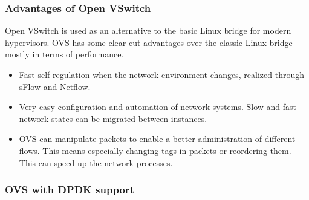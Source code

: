 \documentclass[11pt,a4paper,twoside,openright,bachelor,english]{netthesis}
\begin{document}
\subsubsection{Advantages of Open VSwitch}

Open VSwitch is used as an alternative to the basic Linux bridge for modern hypervisors. OVS has some clear cut advantages over the classic Linux bridge mostly in terms of performance. 
\begin{itemize}

\item Fast self-regulation when the network environment changes, realized through sFlow and Netflow. 

\item Very easy configuration and automation of network systems. Slow and fast network states can be migrated between instances. 

\item OVS can manipulate packets to enable a better administration of different flows. This means especially changing tags in packets or reordering them. This can speed up the network processes. 

\end{itemize}
\cite{pothuraju2016measuring}

\subsubsection{OVS with DPDK support}
\end{document}
